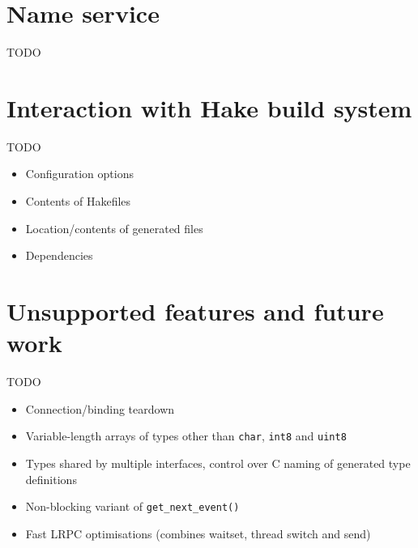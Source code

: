 \documentclass[a4paper,twoside]{report} %
\begin{document}
\chapter{Name service}
\label{cha:nameservice}

TODO


\chapter{Interaction with Hake build system}
\label{cha:hake}

TODO

\begin{itemize}
 \item Configuration options
 \item Contents of Hakefiles
 \item Location/contents of generated files
 \item Dependencies
\end{itemize}


\chapter{Unsupported features and future work}

TODO

\begin{itemize}
 \item Connection/binding teardown
 \item Variable-length arrays of types other than \lstinline+char+,
        \lstinline+int8+ and \lstinline+uint8+
 \item Types shared by multiple interfaces, control over C naming of generated
        type definitions
 \item Non-blocking variant of \lstinline+get_next_event()+
 \item Fast LRPC optimisations (combines waitset, thread switch and send)
\end{itemize}

 

\end{document}
